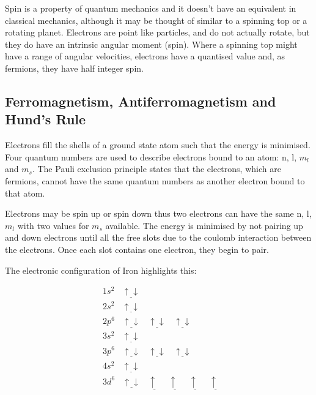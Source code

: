Spin is a property of quantum mechanics and it doesn't have an equivalent in classical mechanics, although it may be thought of similar to a spinning top or a rotating planet.  Electrons are point like particles, and do not actually rotate, but they do have an intrinsic angular moment (spin).  Where a spinning top might have a range of angular velocities, electrons have a quantised value and, as fermions, they have half integer spin.  


\subsection{Ferromagnetism, Antiferromagnetism and Hund's Rule}

Electrons fill the shells of a ground state atom such that the energy is minimised.  Four quantum numbers are used to describe electrons bound to an atom: n, l, $m_l$ and $m_s$.  The Pauli exclusion principle states that the electrons, which are fermions, cannot have the same quantum numbers as another electron bound to that atom.

Electrons may be spin up or spin down thus two electrons can have the same n, l, $m_l$ with two values for $m_s$ available.  The energy is minimised by not pairing up and down electrons until all the free slots due to the coulomb interaction between the electrons.  Once each slot contains one electron, they begin to pair.

The electronic configuration of Iron highlights this:

\begin{equation}
\begin{split}
&1s^2 \:\:\:\: \underline{\uparrow \downarrow} \\
&2s^2 \:\:\:\: \underline{\uparrow \downarrow} \\
&2p^6 \:\:\:\: \underline{\uparrow \downarrow} \:\:\:\:  \underline{\uparrow  \downarrow} \:\:\:\:  \underline{\uparrow  \downarrow} \\
&3s^2 \:\:\:\: \underline{\uparrow \downarrow} \\
&3p^6 \:\:\:\: \underline{\uparrow \downarrow} \:\:\:\:  \underline{\uparrow \downarrow} \:\:\:\:  \underline{\uparrow \downarrow} \\
&4s^2 \:\:\:\: \underline{\uparrow \downarrow} \\
&3d^6 \:\:\:\: \underline{\uparrow \downarrow} \:\:\:\:  \underline{\uparrow \:\:} \:\:\:\:  \underline{\uparrow \:\:} \:\:\:\: \underline{\uparrow \:\:} \:\:\:\: \underline{\uparrow \:\:}\\
\end{split}
\label{eq:fullironconfiguration}
\end{equation}

